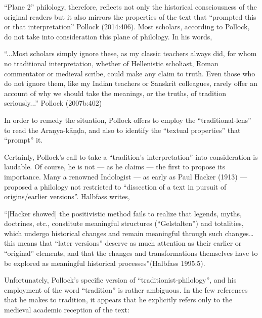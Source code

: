 “Plane 2” philology, therefore, reflects not only the historical consciousness of the original readers but it also mirrors the properties of the text that “prompted this or that interpretation” Pollock (2014:406). Most scholars, according to Pollock, do not take into consideration this plane of philology. In his words,

\begin{myquote} 
“...Most scholars simply ignore these, as my classic teachers always did, for whom no traditional interpretation, whether of Hellenistic scholiast, Roman commentator or medieval scribe, could make any claim to truth. Even those who do not ignore them, like my Indian teachers or Sanskrit colleagues, rarely offer an account of why we should take the meanings, or the truths, of tradition seriously...”
\hfill Pollock (2007b:402)
\end{myquote}

In order to remedy the situation, Pollock offers to employ the “traditional-lens” to read the Araṇya-kāṇḍa, and also to identify the “textual properties” that “prompt” it.  
	
Certainly, Pollock’s call to take a “tradition’s interpretation” into consideration is laudable. Of course, he is not --- as he claims --- the first to propose its importance. Many a renowned Indologist --- as early as Paul Hacker (1913) --- proposed a philology not restricted to “dissection of a text in pursuit of origins/earlier versions”. Halbfass writes, 

\begin{myquote}
“[Hacker showed] the positivistic method fails to realize that legends, myths, doctrines, etc., constitute meaningful structures (“Gelstalten”) and totalities, which undergo historical changes and remain meaningful through such changes… this means that “later versions” deserve as much attention as their earlier or “original” elements, and that the changes and transformations themselves have to be explored as meaningful historical processes”\hfill (Halbfass 1995:5). 
\end{myquote}

Unfortunately, Pollock’s specific version of “traditionist-philology”, and his employment of the word “tradition” is rather ambiguous. In the few references that he makes to tradition, it appears that he explicitly refers only to the medieval academic reception of the text: 

